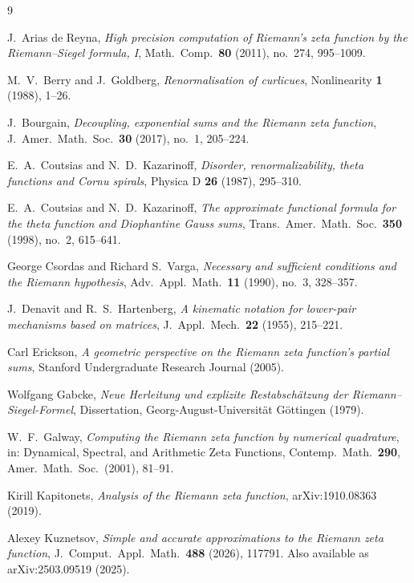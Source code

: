 \documentclass[11pt]{article}
\theoremstyle{definition}
\begin{document}
\clearpage

\begin{thebibliography}{9}

J.~Arias de Reyna, \emph{High precision computation of Riemann's zeta function
by the Riemann--Siegel formula, I}, Math.\ Comp.\ \textbf{80} (2011),
no.~274, 995--1009.

M.~V.\ Berry and J.~Goldberg, \emph{Renormalisation of curlicues},
Nonlinearity \textbf{1} (1988), 1--26.

J.~Bourgain, \emph{Decoupling, exponential sums and the Riemann zeta function},
J.\ Amer.\ Math.\ Soc.\ \textbf{30} (2017), no.~1, 205--224.

E.~A.\ Coutsias and N.~D.\ Kazarinoff, \emph{Disorder, renormalizability, theta
functions and Cornu spirals}, Physica D \textbf{26} (1987), 295--310.

E.~A.\ Coutsias and N.~D.\ Kazarinoff, \emph{The approximate functional formula
for the theta function and Diophantine Gauss sums}, Trans.\ Amer.\ Math.\ Soc.\
\textbf{350} (1998), no.~2, 615--641.

George Csordas and Richard S.\ Varga, \emph{Necessary and sufficient conditions
and the Riemann hypothesis}, Adv.\ Appl.\ Math.\ \textbf{11} (1990), no.~3,
328--357.

J.~Denavit and R.~S.\ Hartenberg, \emph{A kinematic notation for lower-pair
mechanisms based on matrices}, J.\ Appl.\ Mech.\ \textbf{22} (1955), 215--221.

Carl Erickson, \emph{A geometric perspective on the Riemann zeta function's
partial sums}, Stanford Undergraduate Research Journal (2005).

Wolfgang Gabcke, \emph{Neue Herleitung und explizite Restabsch\"atzung der
Riemann--Siegel-Formel}, Dissertation, Georg-August-Universit\"at
G\"ottingen (1979).

W.~F.\ Galway, \emph{Computing the Riemann zeta function by numerical
quadrature}, in: Dynamical, Spectral, and Arithmetic Zeta Functions,
Contemp.\ Math.\ \textbf{290}, Amer.\ Math.\ Soc.\ (2001), 81--91.

Kirill Kapitonets, \emph{Analysis of the Riemann zeta function},
arXiv:1910.08363 (2019).

Alexey Kuznetsov, \emph{Simple and accurate approximations to the Riemann
zeta function}, J.\ Comput.\ Appl.\ Math.\ \textbf{488} (2026), 117791.
Also available as arXiv:2503.09519 (2025).


\end{thebibliography}
\end{document}
